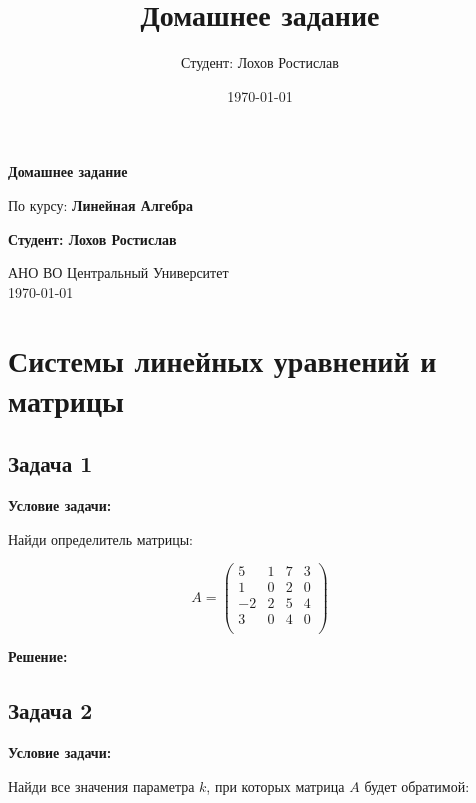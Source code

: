 \documentclass[a4paper,12pt]{article}
\title{Домашнее задание}
\author{Студент: Лохов Ростислав}
\date{\today}
\begin{document}
\begin{titlepage}
    \centering
    \vspace*{1cm}

    \Huge
    \textbf{Домашнее задание}

    \vspace{0.5cm}
    \LARGE
    По курсу: \textbf{Линейная Алгебра}

    \vspace{1.5cm}

    \textbf{Студент: Лохов Ростислав}

    \vfill

    \Large
    АНО ВО Центральный Университет\\
    \vspace{0.3cm}
    \today

\end{titlepage}

\tableofcontents
\newpage

\section{Системы линейных уравнений и матрицы}

\subsection{Задача 1}

\textbf{Условие задачи:}

Найди определитель матрицы:

\[
A = \begin{pmatrix}
5 & 1 & 7 & 3 \\
1 & 0 & 2 & 0 \\
-2 & 2 & 5 & 4 \\
3 & 0 & 4 & 0 \\
\end{pmatrix}
\]

\textbf{Решение:}


\vspace{1cm}

\subsection{Задача 2}

\textbf{Условие задачи:}

Найди все значения параметра \( k \), при которых матрица \( A \) будет обратимой:
\end{document}
